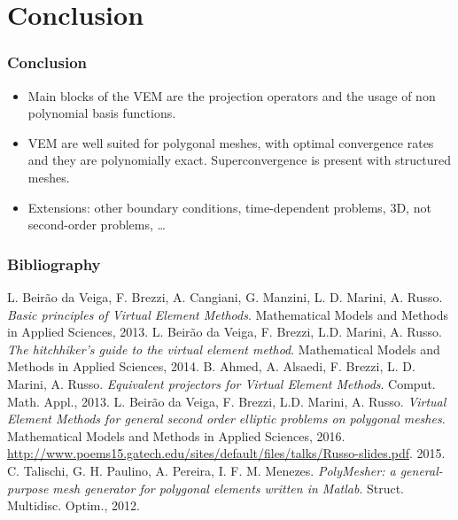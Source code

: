 \documentclass[10pt]{beamer}
\begin{document}
\section{Conclusion}
\begin{frame} \frametitle{Conclusion}

\begin{itemize}
	\item Main blocks of the VEM are the projection operators and the usage of non polynomial basis functions.
	\item VEM are well suited for polygonal meshes, with optimal convergence rates and they are polynomially exact. Superconvergence is present with structured meshes.
	\item Extensions: other boundary conditions, time-dependent problems, 3D, not second-order problems, \dots
\end{itemize}

\end{frame}

\begin{frame}
	\frametitle{Bibliography}
	\begin{thebibliography}{}
		\scriptsize {
		 L. Beir\~{a}o da Veiga, F. Brezzi, A. Cangiani, G. Manzini, L. D. Marini, A. Russo. \textit{Basic principles of Virtual Element Methods}. Mathematical Models and Methods in Applied Sciences, 2013. 
		 L. Beir\~{a}o da Veiga, F. Brezzi, L.D. Marini, A. Russo. \textit{The hitchhiker’s guide to the virtual element method}. Mathematical Models and Methods in Applied Sciences, 2014.
		 B. Ahmed, A. Alsaedi, F. Brezzi, L. D. Marini, A. Russo. \textit{Equivalent projectors for Virtual Element Methods}. Comput. Math. Appl., 2013.
		 L. Beir\~{a}o da Veiga, F. Brezzi, L.D. Marini, A. Russo. \textit{Virtual Element Methods for general second order elliptic problems on polygonal meshes}. Mathematical Models and Methods in Applied Sciences, 2016.
		 \url{http://www.poems15.gatech.edu/sites/default/files/talks/Russo-slides.pdf}. 2015.
		 C. Talischi, G. H. Paulino, A. Pereira, I. F. M. Menezes. \textit{PolyMesher: a general-purpose mesh generator for polygonal elements written in Matlab}. Struct. Multidisc. Optim., 2012.
	}
	\end{thebibliography}
\end{frame}
\end{document}
